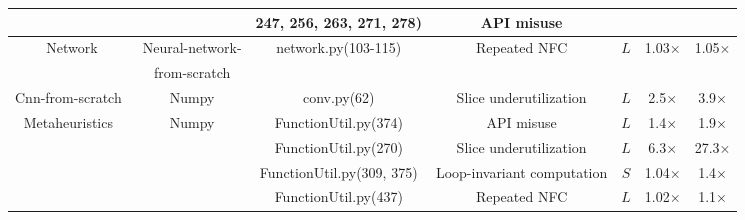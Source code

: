 \begin{table*}[!htbp]
{\begin{tabular}{||c|c|c||c|c||c|c||}
        &  & 247, 256, 263, 271, 278)  & API misuse  &    &  &    \\
    \hline
        \multirow{2}{5em}{Network} & Neural-network-  & \multirow{2}{9em}{network.py(103-115)}  & \multirow{2}{6em}{Repeated NFC}   & \multirow{2}{*}{$L$} &  \multirow{2}{2em}{1.03$\times$}  &  \multirow{2}{2em}{1.05$\times$} \\ 
        
        & from-scratch  &  &  &   &   &   \\ 
    \hline 
        Cnn-from-scratch~\cite{cnnscratch} & Numpy  & conv.py(62)  &  Slice underutilization  & $L$  & 2.5$\times$  & 3.9$\times$    \\ 
    \hline
        \multirow{5}{*}{Metaheuristics~\cite{nguyen2019building, nguyen2018resource}} & \multirow{5}{*}{Numpy} & FunctionUtil.py(374)  & API misuse
        & $L$  & 1.4$\times$  & 1.9$\times$    \\
    \cline{3-7}
        &  & FunctionUtil.py(270)  &  Slice underutilization & $L$ &  6.3$\times$  & 27.3$\times$ \\
    \cline{3-7}
        &  & FunctionUtil.py(309, 375)  &  Loop-invariant computation & $S$  & 1.04$\times$  & 1.4$\times$    \\
    \cline{3-7}
        &  & FunctionUtil.py(437) & Repeated NFC & $L$ &  1.02$\times$  & 1.1$\times$ \\


\end{tabular}}
\end{table*}
